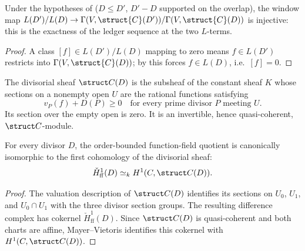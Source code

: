 \begin{theorem}
  \label{thm:adelic_windowMap_injective}
  \leanok
  Under the hypotheses of 
  (\(D \le D'\), \(D' - D\) supported on the overlap), the window map
  \(L(D')/L(D) \to \Gamma(V, \struct{C}(D'))/\Gamma(V, \struct{C}(D))\)
  is injective: this is the exactness of the ledger sequence at the two
  \(L\)-terms.
\end{theorem}
\begin{proof}
  \leanok
  A class \([f] \in L(D')/L(D)\) mapping to zero means \(f \in L(D')\)
  restricts into \(\Gamma(V, \struct{C}(D))\); by
   this forces \(f \in
  L(D)\), i.e.\ \([f] = 0\).
\end{proof}

\begin{definition}
  \label{def:adelic_divisorial_sheaf}
  The divisorial sheaf \(\struct C(D)\) is the subsheaf of the constant
  sheaf \(K\) whose sections on a nonempty open \(U\) are the rational
  functions satisfying
  \[
    v_P(f)+D(P)\geq 0
    \quad\text{for every prime divisor }P\text{ meeting }U.
  \]
  Its section over the empty open is zero.  It is an invertible, hence
  quasi-coherent, \(\struct C\)-module.
\end{definition}

\begin{proposition}
  \label{thm:adelic_function_field_H1_compare}
  For every divisor \(D\), the order-bounded function-field quotient is
  canonically isomorphic to the first cohomology of the divisorial sheaf:
  \[
    \check H^1_{\mathrm{ff}}(D)\simeq_k H^1(C,\struct C(D)).
  \]
\end{proposition}
\begin{proof}
  The valuation description of \(\struct C(D)\) identifies its sections on
  \(U_0\), \(U_1\), and \(U_0\cap U_1\) with the three divisor section
  groups.  The resulting difference complex has cokernel
  \(\check H^1_{\mathrm{ff}}(D)\).  Since \(\struct C(D)\) is
  quasi-coherent and both charts are affine, Mayer--Vietoris identifies
  this cokernel with \(H^1(C,\struct C(D))\).
\end{proof}

